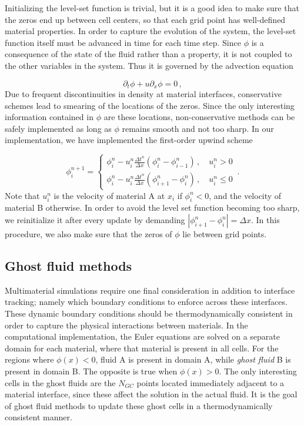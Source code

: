 \documentclass[final,3p,twocolumn]{elsarticle}
\begin{document}
Initializing the level-set function is trivial, but it is a good idea to make
sure that the zeros end up between cell centers, so that each grid point has
well-defined material properties. In order to capture the evolution of the
system, the level-set function itself must be advanced in time for each time
step. Since $\phi$ is a consequence of the state of the fluid rather than a
property, it is not coupled to the other variables in the system.  Thus it is
governed by the advection equation 

\begin{equation}
    \label{eq:phi}
    \partial_t \phi + u\partial_x \phi = 0 \,,
\end{equation}
%
Due to frequent discontinuities in density at material interfaces, conservative
schemes lead to smearing of the locations of the zeros. Since the only
interesting information contained in $\phi$ are these locations,
non-conservative methods can be safely implemented as long as $\phi$ remains
smooth and not too sharp. In our implementation, we have implemented the
first-order upwind scheme 

\begin{equation}
    \label{eq:advanceLevelSet}
    \phi_i^{n+1} = \begin{cases}
        \phi_i^n-u_i^n \frac{\Delta t^n}{\Delta x}(\phi_i^n-\phi_{i-1}^n)
        \,,\quad u_i^n > 0 \\
        \phi_i^n-u_i^n \frac{\Delta t^n}{\Delta x}(\phi_{i+1}^n-\phi_i^n) 
        \,,\quad u_i^n \leq 0
    \end{cases} \,.
\end{equation}
%
Note that $u_i^n$ is the velocity of material A at $x_i$ if $\phi_i^n < 0$, and
the velocity of material B otherwise.  In order to avoid the level set function
becoming too sharp, we reinitialize it after every update by demanding
$|\phi_{i+1}^n-\phi_i^n|=\Delta x$. In this procedure, we also make sure that
the zeros of $\phi$ lie between grid points. 

\subsection{Ghost fluid methods}
\label{subsec:ghostfluid}

Multimaterial simulations require one final consideration in addition to
interface tracking; namely which boundary conditions to enforce across these
interfaces. These dynamic boundary conditions should be thermodynamically
consistent in order to capture the physical interactions between materials. In
the computational implementation, the Euler equations are solved on a separate
domain for each material, where that material is present in all cells. For the
regions where $\phi(x) < 0$, fluid A is present in domain A, while \emph{ghost
fluid} B is present in domain B. The opposite is true when $\phi(x) > 0$. The
only interesting cells in the ghost fluids are the $N_{GC}$ points located
immediately adjacent to a material interface, since these affect the solution
in the actual fluid. It is the goal of ghost fluid methods to update these
ghost cells in a thermodynamically consistent manner. 
\end{document}
